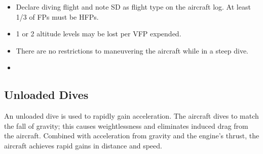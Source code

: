 \begin{itemize}

    \item{} Declare diving flight and note SD as flight type on the aircraft log. At least 1/3 of FPs must be HFPs. 

    \item{} 1 or 2 altitude levels may be lost per VFP expended.

    \item{} There are no restrictions to maneuvering the aircraft while in a steep dive.

    \item{} 

\end{itemize}

\subsection{Unloaded Dives}
\label{rule:unloaded-dives}

An unloaded dive is used to rapidly gain acceleration. The aircraft dives to match the fall of gravity; this causes weightlessness and eliminates induced drag from the aircraft. Combined with acceleration from gravity and the engine's thrust, the aircraft achieves rapid gains in distance and speed.

